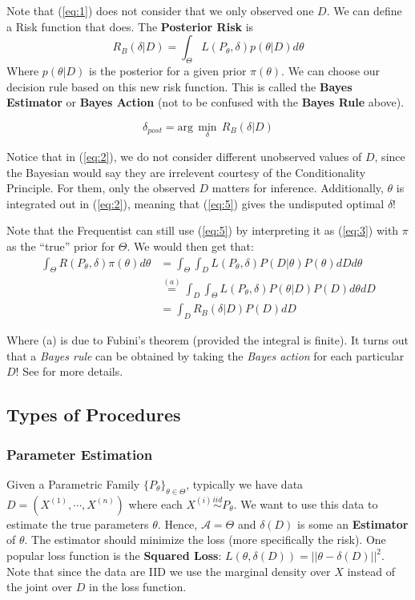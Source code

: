 \documentclass[]{article}
\theoremstyle{mattstyle}
\theoremstyle{definition}
\begin{document}
Note that (\ref{eq:1}) does not consider that we only observed one \(D\). We can define a Risk function that does. The \textbf{Posterior Risk} is
\begin{equation}\label{eq:2}R_B(\delta|D) = \int_{\Theta}^{}L(P_{\theta},\delta)p(\theta|D)d\theta
\end{equation}
Where $p(\theta|D)$ is the posterior for a given prior $\pi(\theta)$. We can choose our decision rule based on this new risk function. This is called the \textbf{Bayes Estimator} or \textbf{Bayes Action} (not to be confused with the \textbf{Bayes Rule} above).

\begin{equation}\label{eq:5}
\delta_{post}= \text{arg}\,\min\limits_{\delta}\,R_B(\delta|D)
\end{equation}


Notice that in (\ref{eq:2}), we do not consider different unobserved values of \(D\), since the Bayesian would say they are irrelevent courtesy of the Conditionality Principle. For them, only the observed $D$ matters for inference. 
Additionally, \(\theta\) is integrated out in (\ref{eq:2}), meaning that (\ref{eq:5}) gives the undisputed optimal \(\delta\)! 

Note that the Frequentist can still use (\ref{eq:5}) by interpreting it as (\ref{eq:3}) with \(\pi\) as the ``true'' prior for \(\Theta\).
We would then get that:
\begin{align*}
 \int_{\Theta}^{}R(P_\theta,\delta)\pi(\theta)d\theta &= \int_{\Theta}^{}\int_{D}L(P_\theta,\delta)P(D|\theta)P(\theta)dDd\theta \\&\overset{(a)}{=} \int_{D}^{}\int_{\Theta}L(P_\theta,\delta)P(\theta|D)P(D)d\theta dD\\
&=\int_{D}^{}R_B(\delta|D)P(D)dD
\end{align*}

Where (a) is due to Fubini's theorem (provided the integral is finite).
It turns out that a \emph{Bayes rule} can be obtained by taking the \emph{Bayes action} for each particular $D$! See \cite{PHoffNotes2} for more details.

\newpage

\subsection{Types of Procedures}

\subsubsection{Parameter Estimation}\label{sec:parest}
Given a Parametric Family $\{P_{\theta}\}_{\theta\in\Theta}$, typically we have data \(D=(X^{(1)}, \cdots, X^{(n)})\) where each \(X^{(i)}\overset{iid}{\sim} P_{\theta}\). We want to use this data to estimate the true parameters \(\theta\). Hence, \(\mathcal{A} = \Theta\) and $\delta(D)$ is some an \textbf{Estimator} of \(\theta\). The estimator should minimize the loss (more specifically the risk). One popular loss function is the \textbf{Squared Loss}: \(L(\theta,\delta(D)) = ||\theta-\delta(D)||^2\). Note that since the data are IID we use the marginal density over $X$ instead of the joint over $D$ in the loss function.
\end{document}
